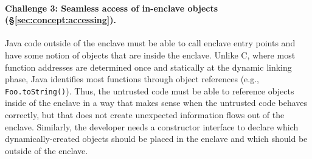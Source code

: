 

\paragraph{\bf Challenge 3: Seamless access of in-enclave objects (\S\ref{sec:concept:accessing}).}
Java code outside of the enclave must be able to call enclave entry points and 
have some notion of objects that are inside the enclave.
Unlike C, where most function addresses are determined once and statically
at the dynamic linking phase,  Java identifies most functions through
object references (e.g., {\tt Foo.toString()}).
Thus, the untrusted code must be able to reference
objects inside of the enclave in a way that makes sense when
the untrusted code behaves correctly, but that does not create unexpected information flows 
out of the enclave.
Similarly, the developer needs a constructor interface to declare which dynamically-created
objects should be placed in the enclave and which should be outside of the enclave. 




